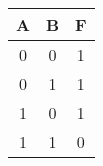 \begin{center}
    
\begin{tabular}{|cc|c|}

\hline
  A & B & F \\ \hline
  0 & 0 & 1 \\ \hline
  0 & 1 & 1 \\ \hline
  1 & 0 & 1 \\ \hline
  1 & 1 & 0 \\ \hline
\end{tabular}
\end{center}
